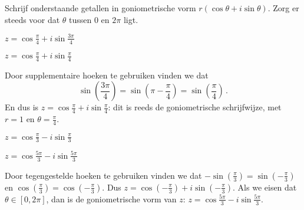 \documentclass{ximera}
\begin{document}
\begin{exercise}
	\begin{statement}
		Schrijf onderstaande getallen in goniometrische vorm $r(\cos\theta+i\sin \theta)$. Zorg er steeds voor dat $\theta$ tussen 0 en $2\pi$ ligt.
	\end{statement}
\begin{question} 
	$z = \cos\frac{\pi}{4}+i\sin\frac{3\pi}{4}$ 
	\begin{uitkomst} $z = \cos\frac{\pi}{4}+i\sin\frac{\pi}{4}$
	\end{uitkomst}
			\begin{oplossing} 
				Door supplementaire hoeken te gebruiken vinden we dat 
				$$
				\sin \left( \frac{3\pi}{4}\right) = \sin \left( \pi-\frac{\pi}{4} \right) = \sin \left(\frac{\pi}{4} \right) \, .
				$$
				En dus is $z = \cos\frac{\pi}{4}+i\sin\frac{\pi}{4}$: dit is reeds de goniometrische schrijfwijze, met $r = 1$ en $\theta = \frac{\pi}{4}$.
				\begin{image}[0.5\textwidth]
				\end{image}
			\end{oplossing}
\end{question}

\begin{question} 
	$z = \cos\frac{\pi}{3} - i\sin\frac{\pi}{3}$ 
	\begin{uitkomst} $z = \cos\frac{5\pi}{3} - i\sin\frac{5\pi}{3}$
	\end{uitkomst}
			\begin{oplossing}
				Door tegengestelde hoeken te gebruiken vinden we dat $ - \sin\left( \frac{\pi}{3} \right) = \sin \left(-\frac{\pi}{3}\right)$ en $\cos \left(\frac{\pi}{3}\right) = \cos \left(- \frac{\pi}{3} \right)$. Dus $ z = \cos \left(-\frac{\pi}{3}\right) + i\sin \left(-\frac{\pi}{3} \right)$. Als we eisen dat $\theta \in [0, 2\pi]$, dan is de goniometrische vorm van $z$: $z = \cos\frac{5\pi}{3} - i\sin\frac{5\pi}{3}$.
				

\end{oplossing}
\end{question}
\end{exercise}
\end{document}
